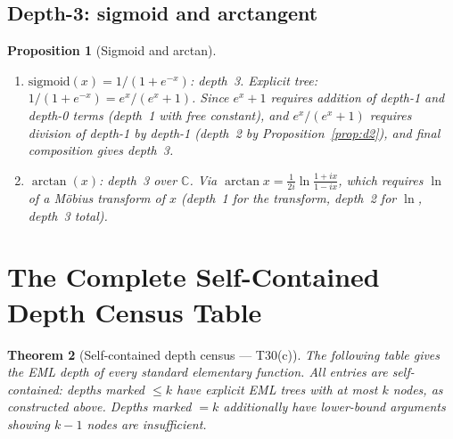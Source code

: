 \documentclass[12pt,a4paper]{article}
\newtheorem{theorem}{Theorem}[section]
\newtheorem{proposition}[theorem]{Proposition}
\theoremstyle{definition}
\theoremstyle{remark}
\begin{document}
\subsection{Depth-3: sigmoid and arctangent}

\begin{proposition}[Sigmoid and arctan]\label{prop:sig-atan}
\mbox{}
\begin{enumerate}
  \item $\mathrm{sigmoid}(x) = 1/(1+e^{-x})$: depth~3.
        Explicit tree: $1/(1+e^{-x}) = e^x/(e^x+1)$.
        Since $e^x+1$ requires addition of depth-1 and depth-0 terms (depth~1 with free constant),
        and $e^x/(e^x+1)$ requires division of depth-1 by depth-1 (depth~2 by
        Proposition~\ref{prop:d2}), and final composition gives depth~3.

  \item $\arctan(x)$: depth~3 over $\mathbb{C}$.
        Via $\arctan x = \frac{1}{2i}\ln\frac{1+ix}{1-ix}$, which requires $\ln$ of a
        M\"{o}bius transform of $x$ (depth~1 for the transform, depth~2 for $\ln$, depth~3 total).
\end{enumerate}
\end{proposition}

\section{The Complete Self-Contained Depth Census Table}
\label{sec:table}

\begin{theorem}[Self-contained depth census --- T30(c)]\label{thm:census}
The following table gives the EML depth of every standard elementary function.
All entries are self-contained: depths marked $\leq k$ have explicit EML trees
with at most $k$ nodes, as constructed above.
Depths marked $= k$ additionally have lower-bound arguments showing $k-1$ nodes
are insufficient.
\end{theorem}
\end{document}

